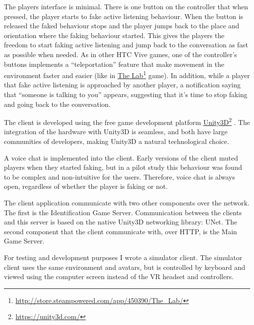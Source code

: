 \documentclass[]{simple-thesis}
\newcommand\fnurl[2]{%
  \href{#2}{#1}\footnote{\url{#2}}%
}
\begin{document}
The players interface is minimal.
There is one button on the controller that when pressed, the player starts to fake active listening behaviour.
When the button is released the faked behaviour stops and the player jumps back to the place and orientation where the faking behaviour started.
This gives the players the freedom to start faking active listening and jump back to the conversation as fast as possible when needed.
As in other HTC Vive games, one of the controller's buttons implements a ``teleportation'' feature that make movement in the environment faster and easier (like in \fnurl{The Lab}{http://store.steampowered.com/app/450390/The_Lab/} game).
In addition, while a player that fake active listening is approached by another player, a notification saying that ``someone is talking to you'' appears, suggesting that it's time to stop faking and going back to the conversation.

The client is developed using the free game development platform \fnurl{Unity3D}{https://unity3d.com/}.
The integration of the hardware with Unity3D is seamless, and both have large communities of developers, making Unity3D a natural technological choice.

A voice chat is implemented into the client.
Early versions of the client muted players when they started faking, but in a pilot study this behaviour was found to be complex and non-intuitive for the users.
Therefore, voice chat is always open, regardless of whether the player is faking or not.

The client application communicate with two other components over the network.
The first is the Identification Game Server.
Communication between the clients and this server is based on the native Unity3D networking library: UNet.
The second component that the client communicate with, over HTTP, is the Main Game Server.

For testing and development purposes I wrote a simulator client.
The simulator client uses the same environment and avatars, but is controlled by keyboard and viewed using the computer screen instead of the VR headset and controllers.
\end{document}
